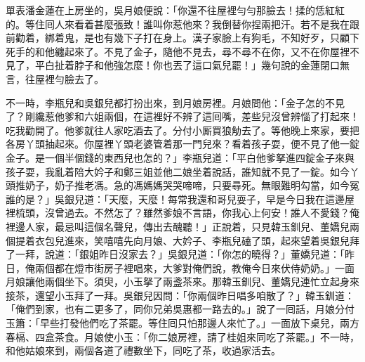 單表潘金蓮在上房坐的，吳月娘便說：「你還不往屋裡勻勻那臉去！揉的恁紅紅的。等住囘人來看着甚麼張致！誰叫你惹他來？我倒替你捏兩把汗。若不是我在跟前勸着，綁着鬼，是也有幾下子打在身上。漢子家臉上有狗毛，不知好歹，{}只顧下死手的和他纏起來了。不見了金子，隨他不見去，尋不尋不在你，又不在你屋裡不見了，平白扯着脖子和他強怎麼！你也丟了這口氣兒罷！」{}幾句說的金蓮閉口無言，往屋裡勻臉去了。

不一時，李瓶兒和吳銀兒都打扮出來，到月娘房裡。月娘問他：「金子怎的不見了？剛纔惹他爹和六姐兩個，在這裡好不辨了這囘嘴，差些兒沒曾辨惱了打起來！吃我勸開了。他爹就往人家吃酒去了。分付小厮買狼觔去了。等他晚上來家，要把各房丫頭抽起來。你屋裡丫頭老婆管着那一門兒來？看着孩子耍，便不見了他一錠金子。是一個半個錢的東西兒也怎的？」李瓶兒道：「平白他爹拏進四錠金子來與孩子耍，我亂着陪大妗子和鄭三姐並他二娘坐着說話，誰知就不見了一錠。如今丫頭推奶子，奶子推老馮。急的馮媽媽哭哭啼啼，只要尋死。無眼難明勾當，如今冤誰的是？」{}吳銀兒道：「天麼，天麼！每常我還和哥兒耍子，早是今日我在這邊屋裡梳頭，沒曾過去。不然怎了？雖然爹娘不言語，你我心上何安！誰人不愛錢？俺裡邊人家，最忌叫這個名聲兒，傳出去醜聽！」正說着，只見韓玉釧兒、董嬌兒兩個提着衣包兒進來，笑嘻嘻先向月娘、大妗子、李瓶兒磕了頭，起來望着吳銀兒拜了一拜，說道：「銀姐昨日沒家去？」吳銀兒道：「你怎的曉得？」董嬌兒道：「昨日，俺兩個都在燈市街房子裡唱來，大爹對俺們說，教俺今日來伏侍奶奶。」一面月娘讓他兩個坐下。須臾，小玉拏了兩盞茶來。那韓玉釧兒、董嬌兒連忙立起身來接茶，還望小玉拜了一拜。吳銀兒因問：「你兩個昨日唱多咱散了？」韓玉釧道：「俺們到家，也有二更多了，同你兄弟吳惠都一路去的。」說了一囘話，月娘分付玉簫：「早些打發他們吃了茶罷。等住囘只怕那邊人來忙了。」一面放下桌兒，兩方春槅、四盒茶食。月娘使小玉：「你二娘房裡，請了桂姐來同吃了茶罷。」不一時，和他姑娘來到，兩個各道了禮數坐下，同吃了茶，收過家活去。

